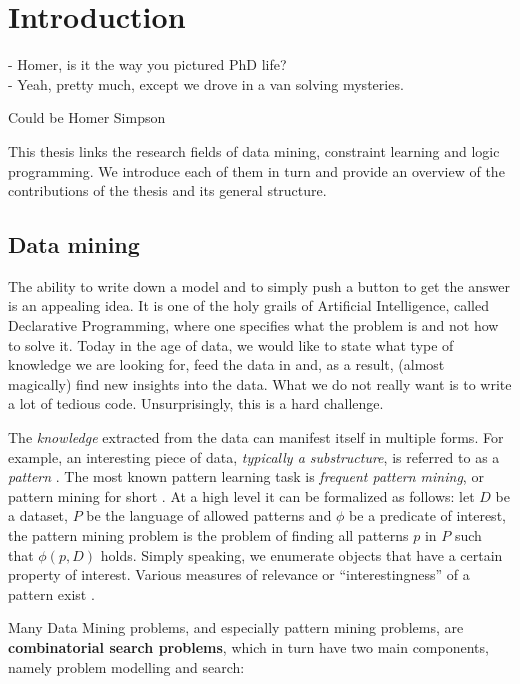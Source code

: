 \chapter{Introduction}\label{ch:introduction}
\epigraph{
- Homer, is it the way you pictured PhD life?\\
- Yeah, pretty much, except we drove in a van solving mysteries.
}{Could be Homer Simpson}

\begin{addmargin}[5em]{5em}
This thesis links the research fields of data mining, constraint learning
and logic programming. We introduce each of them in turn and provide an overview of the
contributions of the thesis and
its general structure.
\end{addmargin}

\section{Data mining}
The ability to write down a model and to simply push a button to get the
answer is an appealing idea. It is one of the holy grails of
Artificial Intelligence, called Declarative Programming, where one
specifies what the problem is and not how to solve it. Today in the age of data, we would like
to state what type of knowledge we are looking for, feed the data in and, as a result,
(almost magically) find new insights into the data. What we do not really want is to write
a lot of tedious code. Unsurprisingly, this is a hard challenge. 


The \textit{knowledge} extracted from the data can manifest itself in
multiple forms. For example, an interesting piece of data,
\textit{typically a substructure}, is referred to as a \textit{pattern} \parencite{han_book}. 
The most known pattern learning task is 
\textit{frequent pattern mining}, or pattern mining for short \parencite{survey_han}. 
At a high level it can be formalized as follows: 
let $D$ be a dataset, $P$ be the language of allowed patterns and
$\phi$ be a predicate of
interest, the pattern mining problem is the problem of finding
all patterns $p$ in $P$ such that $\phi(p,D)$ holds.
Simply speaking, we enumerate objects that have a certain property of
interest.
Various measures of relevance or ``interestingness'' of a pattern exist \parencite{tias_topk}.


Many Data Mining problems, and especially pattern mining
problems, are \textbf{combinatorial search problems}, which in turn have two main components, namely problem modelling and search: 

